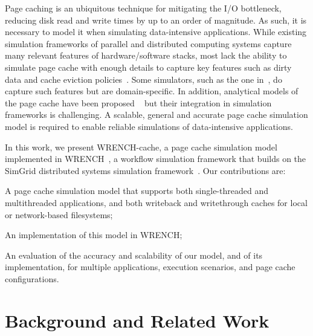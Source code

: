 \documentclass[conference]{IEEEtran}
\newcommand{\simgrid}{SimGrid\xspace}
\newcommand{\wrench}{WRENCH\xspace}
\begin{document}
    Page caching is an ubiquitous technique for mitigating the I/O
    bottleneck, reducing disk read and write times by up to an order of
    magnitude. As such, it is necessary to model it
    when simulating data-intensive applications.
    While existing simulation frameworks of parallel and distributed computing
    systems  capture many relevant features of hardware/software stacks, 
    most lack the ability to simulate page cache with enough details to capture key features such
    as dirty data and cache eviction policies~\cite{nunez2012simcan,nunez2012icancloud}. 
    Some simulators, such as the one in~\cite{xu2018saving}, do capture such features
    but are domain-specific. In addition, analytical models of the page
    cache have been proposed ~\cite{DBLP:journals/concurrency/InacioD18,
    DBLP:journals/pacmpl/BaoKPS18, DBLP:conf/pldi/GysiGBH19} but their
    integration in simulation frameworks is challenging. A scalable, general and accurate
    page cache simulation model is required to enable reliable simulations of
    data-intensive applications. 


    In this work, we present \wrench-cache, a page cache simulation model
    implemented in \wrench~\cite{casanova2020fgcs}, a workflow simulation
    framework that builds on the \simgrid distributed systems simulation
    framework~\cite{casanova2014simgrid}. Our contributions are:
    \begin{compactitem}
        \item A page cache simulation model that supports 
    both single-threaded and multithreaded applications, and both
    writeback and writethrough caches for local or network-based
    filesystems;
        \item An implementation of this model in \wrench; 
        \item An evaluation of the accuracy and scalability of our model, and of its implementation,
              for multiple applications, execution scenarios, and page cache configurations. 
    \end{compactitem}


    \section{Background and Related Work}
    \label{relatedwork}
\end{document}

